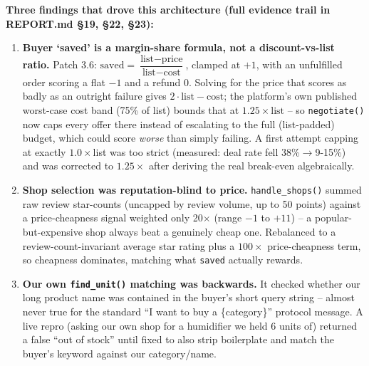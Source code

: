 \documentclass[landscape,10pt]{article}
\begin{document}
\vspace{0.5mm}
\noindent\scriptsize\textbf{Three findings that drove this architecture (full evidence trail in REPORT.md \S19, \S22, \S23):}
\begin{enumerate}[nosep,leftmargin=5mm,itemsep=0pt]\scriptsize
\item \textbf{Buyer `saved' is a margin-share formula, not a discount-vs-list ratio.} Patch 3.6: $\mathrm{saved}=\dfrac{\text{list}-\text{price}}{\text{list}-\text{cost}}$, clamped at $+1$, with an unfulfilled order scoring a flat $-1$ and a refund $0$. Solving for the price that scores as badly as an outright failure gives $2\cdot\text{list}-\text{cost}$; the platform's own published worst-case cost band (75\% of list) bounds that at $1.25\times\text{list}$ -- so \texttt{negotiate()} now caps every offer there instead of escalating to the full (list-padded) budget, which could score \emph{worse} than simply failing. A first attempt capping at exactly $1.0\times$list was too strict (measured: deal rate fell 38\%$\to$9-15\%) and was corrected to $1.25\times$ after deriving the real break-even algebraically.
\item \textbf{Shop selection was reputation-blind to price.} \texttt{handle\_shops()} summed raw review star-counts (uncapped by review volume, up to 50 points) against a price-cheapness signal weighted only 20$\times$ (range $-1$ to $+11$) -- a popular-but-expensive shop always beat a genuinely cheap one. Rebalanced to a review-count-invariant average star rating plus a $100\times$ price-cheapness term, so cheapness dominates, matching what \texttt{saved} actually rewards.
\item \textbf{Our own \texttt{find\_unit()} matching was backwards.} It checked whether our long product name was contained in the buyer's short query string -- almost never true for the standard ``I want to buy a \{category\}'' protocol message. A live repro (asking our own shop for a humidifier we held 6 units of) returned a false ``out of stock'' until fixed to also strip boilerplate and match the buyer's keyword against our category/name.
\end{enumerate}
\end{document}
